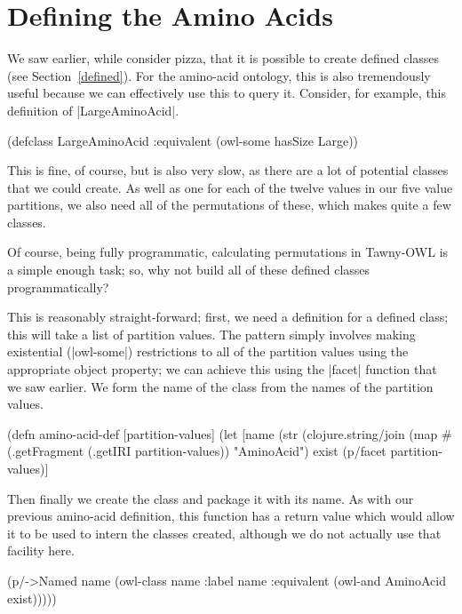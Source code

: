 \section{Defining the Amino Acids}
\label{sec:defining-amino-acids}

We saw earlier, while consider pizza, that it is possible to create
defined classes (see Section~\ref{defined}). For the amino-acid
ontology, this is also tremendously useful because we can effectively
use this to query it. Consider, for example, this definition of
|LargeAminoAcid|.

\begin{tawnyexample}
(defclass LargeAminoAcid
  :equivalent (owl-some hasSize Large))
\end{tawnyexample}

This is fine, of course, but is also very slow, as there are a lot of
potential classes that we could create. As well as one for each of the twelve
values in our five value partitions, we also need all of the permutations of
these, which makes quite a few classes.

Of course, being fully programmatic, calculating permutations in Tawny-OWL is
a simple enough task; so, why not build all of these defined classes
programmatically?

This is reasonably straight-forward; first, we need a definition for a
defined class; this will take a list of partition values. The pattern
simply involves making existential (|owl-some|) restrictions to all of
the partition values using the appropriate object property; we can
achieve this using the |facet| function that we saw earlier. We form
the name of the class from the names of the partition values.

\begin{tawny}
(defn amino-acid-def [partition-values]
  (let [name
        (str
         (clojure.string/join
          (map
           #(.getFragment
             (.getIRI %
           partition-values))
         "AminoAcid")
        exist (p/facet partition-values)]
\end{tawny}

Then finally we create the class and package it with its name. As with our
previous amino-acid definition, this function has a return value which would
allow it to be used to intern the classes created, although we do not actually
use that facility here.

\begin{tawny}
    (p/->Named
     name
     (owl-class
      name
      :label name
      :equivalent
      (owl-and AminoAcid exist)))))
\end{tawny}

